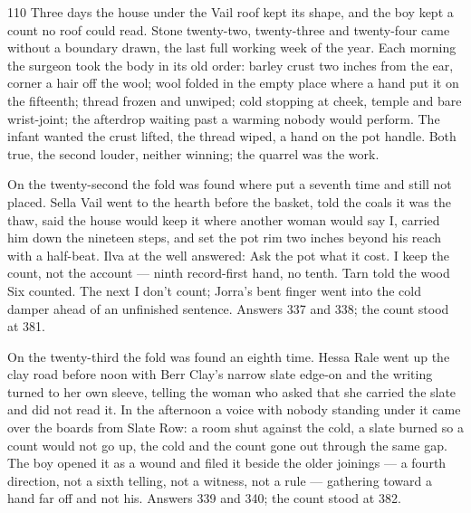 
\scenebreak


\scenebreak


\scenebreak

\CRtailpiece
\begin{CRchronicle}{110}
Three days the house under the Vail roof kept its shape, and the boy kept a count no roof could read. Stone twenty-two, twenty-three and twenty-four came without a boundary drawn, the last full working week of the year. Each morning the surgeon took the body in its old order: barley crust two inches from the ear, corner a hair off the wool; wool folded in the empty place where a hand put it on the fifteenth; thread frozen and unwiped; cold stopping at cheek, temple and bare wrist-joint; the afterdrop waiting past a warming nobody would perform. The infant wanted the crust lifted, the thread wiped, a hand on the pot handle. Both true, the second louder, neither winning; the quarrel was the work.

On the twenty-second the fold was found where put a seventh time and still not placed. Sella Vail went to the hearth before the basket, told the coals it was the thaw, said the house would keep it where another woman would say I, carried him down the nineteen steps, and set the pot rim two inches beyond his reach with a half-beat. Ilva at the well answered: Ask the pot what it cost. I keep the count, not the account — ninth record-first hand, no tenth. Tarn told the wood Six counted. The next I don’t count; Jorra’s bent finger went into the cold damper ahead of an unfinished sentence. Answers 337 and 338; the count stood at 381.

On the twenty-third the fold was found an eighth time. Hessa Rale went up the clay road before noon with Berr Clay’s narrow slate edge-on and the writing turned to her own sleeve, telling the woman who asked that she carried the slate and did not read it. In the afternoon a voice with nobody standing under it came over the boards from Slate Row: a room shut against the cold, a slate burned so a count would not go up, the cold and the count gone out through the same gap. The boy opened it as a wound and filed it beside the older joinings — a fourth direction, not a sixth telling, not a witness, not a rule — gathering toward a hand far off and not his. Answers 339 and 340; the count stood at 382.


\end{CRchronicle}
